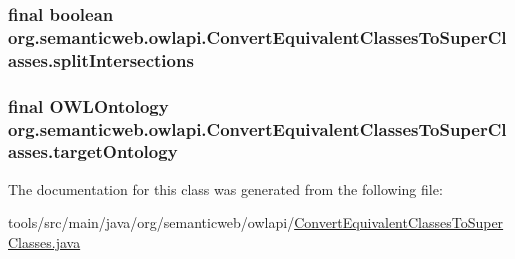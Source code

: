 \hypertarget{classorg_1_1semanticweb_1_1owlapi_1_1_convert_equivalent_classes_to_super_classes_addb6f40f0ea084faa384ce22690b17c0}{
\subsubsection[{split\-Intersections}]{\setlength{\rightskip}{0pt plus 5cm}final boolean org.\-semanticweb.\-owlapi.\-Convert\-Equivalent\-Classes\-To\-Super\-Classes.\-split\-Intersections\hspace{0.3cm}{\ttfamily [private]}}}\label{classorg_1_1semanticweb_1_1owlapi_1_1_convert_equivalent_classes_to_super_classes_addb6f40f0ea084faa384ce22690b17c0}
\hypertarget{classorg_1_1semanticweb_1_1owlapi_1_1_convert_equivalent_classes_to_super_classes_ac3c217dfc21f6996f8c786eeb178afed}{
\subsubsection[{target\-Ontology}]{\setlength{\rightskip}{0pt plus 5cm}final {\bf O\-W\-L\-Ontology} org.\-semanticweb.\-owlapi.\-Convert\-Equivalent\-Classes\-To\-Super\-Classes.\-target\-Ontology\hspace{0.3cm}{\ttfamily [private]}}}\label{classorg_1_1semanticweb_1_1owlapi_1_1_convert_equivalent_classes_to_super_classes_ac3c217dfc21f6996f8c786eeb178afed}


The documentation for this class was generated from the following file\-:\begin{DoxyCompactItemize}
\item 
tools/src/main/java/org/semanticweb/owlapi/\hyperlink{_convert_equivalent_classes_to_super_classes_8java}{Convert\-Equivalent\-Classes\-To\-Super\-Classes.\-java}\end{DoxyCompactItemize}
